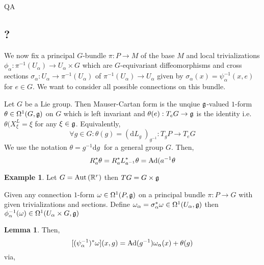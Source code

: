 QA	 \documentclass[12pt]{extarticle}
\newcommand{\R}{\mathbb{R}}
\renewcommand{\d}[1]{ \mathrm{d}#1 \:}
\theoremstyle{definition}
\newtheorem{lemma}[theorem]{Lemma}
\newtheorem{example}[theorem]{Example}
\newenvironment{definition}[1][Definition:]{\begin{trivlist}
\item[\hskip \labelsep {\bfseries #1}]}{\end{trivlist}}
\begin{document}
\subsection{?}

We now fix a principal $G$-bundle $\pi : P \to M$ of the base $M$ and local trivializations $\phi_\alpha : \pi^{-1}(U_\alpha) \to U_\alpha \times G$ which are $G$-equivariant diffeomorphisms and cross sections $\sigma_\alpha  : U_\alpha \to \pi^{-1}(U_\alpha)$ of $\pi^{-1}(U_\alpha) \to U_\alpha$ given by $\sigma_\alpha(x) = \psi_\alpha^{-1}(x, e)$ for $e \in G$. We want to consider all possible connections on this bundle. 

\begin{definition}
Let $G$ be a Lie group. Then Mauser-Cartan form is the unqiue $\mathfrak{g}$-valued $1$-form $\theta \in \Omega^1(G, \mathfrak{g})$ on $G$ which is left invariant and $\theta(e) : T_e G \to \mathfrak{g}$ is the identity i.e. $\theta(X^L_\xi = \xi$ for any $\xi \in \mathfrak{g}$. Equivalently,
\[ \forall g \in G : \theta(g) = (\d{L_g})_{g^{-1}} : T_g P \to T_e G  \]
We use the notation $\theta = g^{-1} \d{g}$ for a general group $G$. Then,
\[ R_a^* \theta = R_a^* L_{a^{-1}}^* \theta = \mathrm{Ad}{(a^{-1}} \theta \]
\end{definition}

\begin{example}
Let $G = \Aut{\R^r}$ then $TG = G \times \mathfrak{g}$ 
\end{example}

\begin{definition}
Given any connection $1$-form $\omega \in \Omega^1(P, \mathfrak{g})$ on a principal bundle $\pi : P \to G$ with given trivializations and sections. Define $\omega_\alpha = \sigma_\alpha^* \omega \in \Omega^1(U_\alpha, \mathfrak{g})$ then $\phi_\alpha^{-1}(\omega) \in \Omega^1(U_\alpha \times G, \mathfrak{g})$
\end{definition}

\begin{lemma}
Then,
\[ [(\psi^{-1}_\alpha)^* \omega](x,g) = \mathrm{Ad}{(g^{-1})} \omega_\alpha(x) + \theta(g) \]
via,
\begin{center}
\end{center}
\end{lemma}
\end{document}

